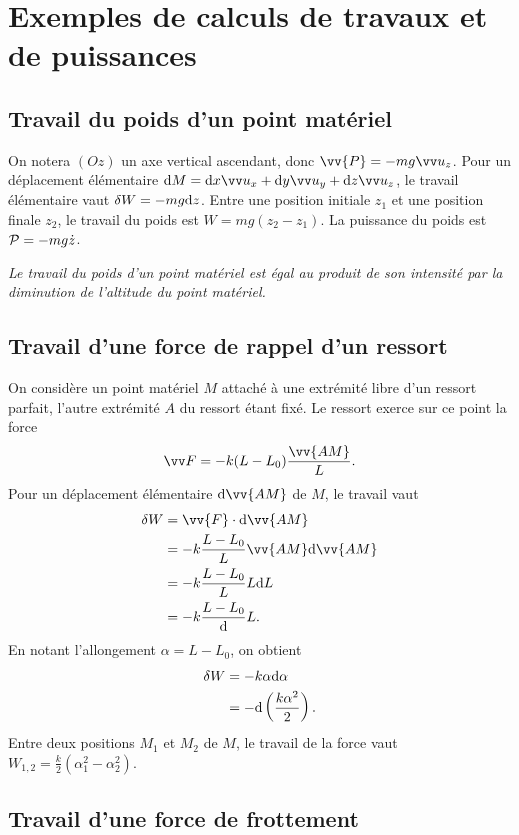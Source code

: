 \section{Exemples de calculs de travaux et de puissances}
\label{chap-4sec:exemplesdecalculs}
\subsection{Travail du poids d'un point matériel}
\label{chap4-subsec:travaildupoids}
On notera \((Oz)\) un axe vertical ascendant, donc \(\vv{P}=-mg\uz\). Pour un déplacement élémentaire \(\D M = \D x \ux + \D y \uy + \D z \uz\), le travail élémentaire vaut \(\delta W = -mg\D z\). Entre une position initiale \(z_1\) et une position finale \(z_2\), le travail du poids est \(W=mg(z_2-z_1)\). La puissance du poids est \(\P=-mg\dot{z}\).

\emph{Le travail du poids d'un point matériel est égal au produit de son intensité par la diminution de l'altitude du point matériel.}

\subsection{Travail d'une force de rappel d'un ressort}
\label{chap4-subsec:travailduneforcederappel}

On considère un point matériel \(M\) attaché à une extrémité libre d'un ressort parfait, l'autre extrémité \(A\) du ressort étant fixé. Le ressort exerce sur ce point la force
\begin{equation}
  \vF = -k(L-L_0)\frac{\vv{AM}}{L}.
\end{equation}
Pour un déplacement élémentaire \(\D \vv{AM}\) de \(M\), le travail vaut
\begin{align}
  \delta W &= \vv{F} \cdot \D \vv{AM} \\
  &= -k \frac{L-L_0}{L} \vv{AM} \D \vv{AM} \\
  &= -k \frac{L-L_0}{L} L \D L \\
  &= -k \frac{L-L_0} \D L.
\end{align}
En notant l'allongement \(\alpha = L-L_0\), on obtient
\begin{align}
  \delta W &= -k\alpha \D \alpha\\
  &=-\D \left(\frac{k\alpha^2}{2}\right).
\end{align}
Entre deux positions \(M_1\) et \(M_2\) de \(M\), le travail de la force vaut \(W_{1,2}=\frac{k}{2}(\alpha_1^2-\alpha_2^2)\).

\subsection{Travail d'une force de frottement}
\label{chap4-subsec:travaildufrottement}

